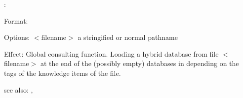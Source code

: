 \colab{} \consult:

Format: 

Options: $<$filename$>$ a stringified or normal pathname

Effect: Global consulting function.
        Loading a hybrid database from file $<$filename$>$ at the end of the
        (possibly empty) databases in \COLAB{} depending on the tags of the
        knowledge items of the file.

see also: \destroy, \replace
